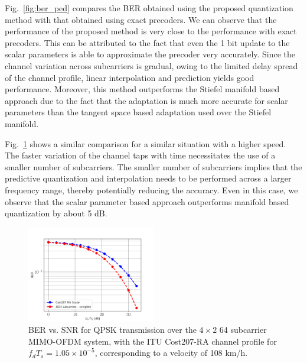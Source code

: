 \documentclass[journal,10pt,twocolumn]{IEEEtran}
\begin{document}
Fig.~\ref{fig:ber_ped} compares the BER obtained using the proposed
quantization method with that obtained using exact precoders. We can
observe that the performance of the proposed method is very close to
the performance with exact precoders. This can be attributed to the
fact that even the 1 bit update to the scalar parameters is able to
approximate the precoder very accurately. Since the channel variation
across subcarriers is gradual, owing to the limited delay spread of
the channel profile, linear interpolation and prediction yields good
performance. Moreover, this method outperforms the Stiefel manifold
based approach due to the fact that the adaptation is much more
accurate for scalar parameters than the tangent space based adaptation
used over the Stiefel manifold.

Fig.~\ref{fig:ber_veh} shows a similar comparison for a similar
situation with a higher speed. The faster variation of the channel
taps with time necessitates the use of a smaller number of
subcarriers. The smaller number of subcarriers implies that the
predictive quantization and interpolation needs to be performed across
a larger frequency range, thereby potentially reducing the
accuracy. Even in this case, we observe that the scalar parameter
based approach outperforms manifold based quantization by about 5 dB.

\begin{figure}
\includegraphics[width=0.5\textwidth]{images/cost01}
\caption{BER vs. SNR for QPSK transmission over the $4\times 2$ 64
  subcarrier MIMO-OFDM system, with the ITU Cost207-RA channel profile
  for $f_dT_s = 1.05\times 10^{-5}$, corresponding to a velocity of 108 km/h.}
\label{fig:ber_veh}
\end{figure}


\end{document}

